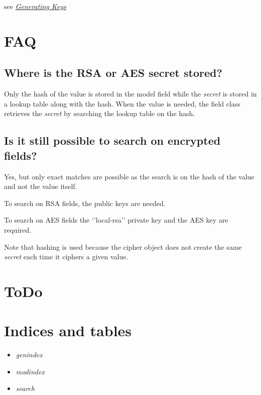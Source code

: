 \documentclass[letterpaper,10pt,english]{sphinxmanual}
\begin{document}
see {\hyperref[generating_keys::doc]{\emph{Generating Keys}}}


\chapter{FAQ}
\label{faq:faq}\label{faq::doc}

\section{Where is the RSA or AES secret stored?}
\label{faq:where-is-the-rsa-or-aes-secret-stored}
Only the hash of the value is stored in the model field while the \emph{secret} is stored in a lookup table along with the hash. When
the value is needed, the field class retrieves the \emph{secret} by searching the lookup table on the hash.


\section{Is it still possible to search on encrypted fields?}
\label{faq:is-it-still-possible-to-search-on-encrypted-fields}
Yes, but only exact matches are possible as the search is on the hash of the value and not the value itself.

To search on RSA fields, the public keys are needed.

To search on AES fields the `'local-rsa'' private key and the AES key are required.

Note that hashing is used because the cipher object does not create the same \emph{secret} each time it ciphers a given value.


\chapter{ToDo}
\label{todo:todo}\label{todo::doc}

\chapter{Indices and tables}
\label{index:indices-and-tables}\begin{itemize}
\item {} 
\emph{genindex}

\item {} 
\emph{modindex}

\item {} 
\emph{search}

\end{itemize}
\end{document}

